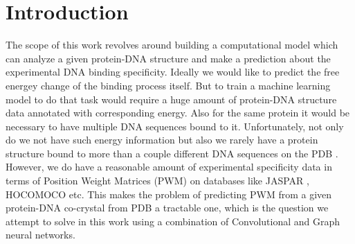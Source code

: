 \section{Introduction} 

The scope of this work revolves around building a computational model which can analyze a given
protein-DNA structure and make a prediction about the experimental DNA binding specificity. Ideally we
would like to predict the free energey change of the binding process itself. But to train a
machine learning model to do that task would require a huge amount of protein-DNA
structure data annotated with corresponding energy. Also for the same protein it would be necessary
to have multiple DNA sequences bound to it. Unfortunately, not only do we not have such energy information
but also we rarely have a protein structure bound to more than a couple different DNA sequences on
the PDB \citep{berman2000protein}. However, we do have a reasonable amount of experimental
specificity data in terms of Position Weight Matrices (PWM) on databases like
JASPAR \citep{fornes2020jaspar}, HOCOMOCO \citep{kulakovskiy2018hocomoco} etc. This makes the problem of predicting PWM from
a given protein-DNA co-crystal from PDB a tractable one, which is the question we attempt to solve
in this work using a combination of Convolutional and Graph neural networks.

